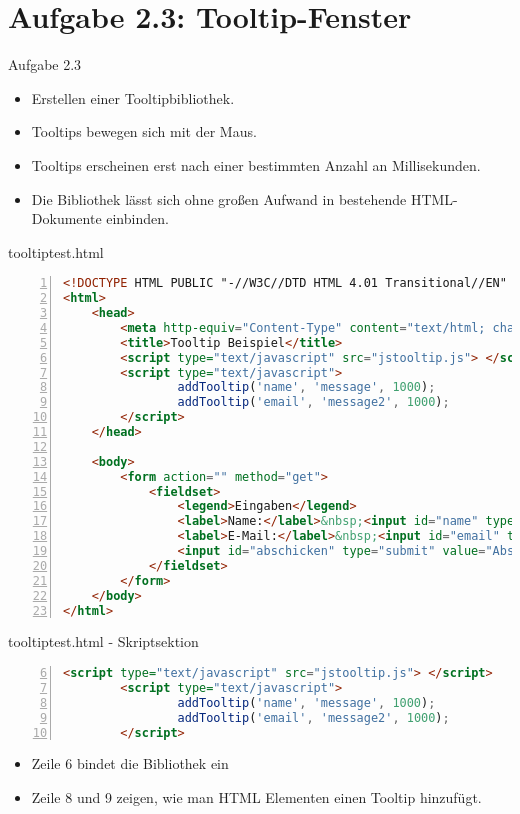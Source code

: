 \section{Aufgabe 2.3: Tooltip-Fenster}
\begin{frame}[<+->]{Aufgabe 2.3}
\normalsize
\begin{itemize}
\item Erstellen einer Tooltipbibliothek.
\item Tooltips bewegen sich mit der Maus.
\item Tooltips erscheinen erst nach einer bestimmten Anzahl an Millisekunden.
\item Die Bibliothek lässt sich ohne großen Aufwand in bestehende HTML-Dokumente einbinden.
\end{itemize}
\end{frame}
\begin{frame}[fragile]{tooltiptest.html}
\tiny{\begin{lstlisting}[language = HTML,
                                   mathescape = true, 
                   breaklines=true, 
  		   keywordstyle=\color{blue}\bfseries,
  stringstyle=\color{red}\ttfamily,
                   numbers = left, 
                   numbersep = 3pt]
<!DOCTYPE HTML PUBLIC "-//W3C//DTD HTML 4.01 Transitional//EN" "http://www.w3.org/TR/html4/loose.dtd">
<html>
    <head>
        <meta http-equiv="Content-Type" content="text/html; charset=utf-8">
        <title>Tooltip Beispiel</title>
        <script type="text/javascript" src="jstooltip.js"> </script>
        <script type="text/javascript">
                addTooltip('name', 'message', 1000);
                addTooltip('email', 'message2', 1000);
        </script>
    </head>
    
    <body>
		<form action="" method="get">
			<fieldset>
            	<legend>Eingaben</legend>
                <label>Name:</label>&nbsp;<input id="name" type="text"><br>
                <label>E-Mail:</label>&nbsp;<input id="email" type="text">
                <input id="abschicken" type="submit" value="Abschicken">
			</fieldset>
		</form>    	
    </body>
</html>
\end{lstlisting}
}
\end{frame}
\normalsize
\begin{frame}[<+->][fragile]{tooltiptest.html - Skriptsektion}
\tiny{\begin{lstlisting}[language = HTML,
  		   keywordstyle=\color{blue}\bfseries,
  stringstyle=\color{red}\ttfamily,
			numbers=left,
			firstnumber=6,
			numbersep = 3pt]
        <script type="text/javascript" src="jstooltip.js"> </script>
        <script type="text/javascript">
                addTooltip('name', 'message', 1000);
                addTooltip('email', 'message2', 1000);
        </script>
\end{lstlisting}}
\pause
\begin{itemize}
\normalsize
\item Zeile 6 bindet die Bibliothek ein
\item Zeile 8 und 9 zeigen, wie man HTML Elementen einen Tooltip hinzufügt.
\end{itemize}
\end{frame}
